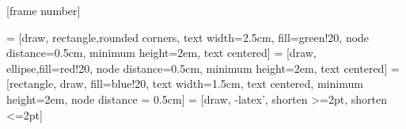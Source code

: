 \usepackage[french]{babel}
\usepackage{lmodern}
\usepackage{graphicx}
\usepackage{xcolor}
\usepackage{textcomp} 
\usepackage{amsmath, amsfonts, amssymb, amsthm}
\usepackage{booktabs,multirow}
\usepackage{setspace}
\usepackage{float}
\usepackage{pgfpages}
\usepackage{colortbl}
\usepackage{epstopdf}
\usepackage{framed}
\usepackage{etoolbox}
\usepackage{tikz}



[frame number]

\usetikzlibrary{shapes,arrows,calc, positioning}
 = [draw, rectangle,rounded corners, text width=2.5cm, fill=green!20, node distance=0.5cm, minimum height=2em, text centered]
 = [draw, ellipse,fill=red!20, node distance=0.5cm, minimum height=2em, text centered]
 = [rectangle, draw, fill=blue!20, 
    text width=1.5cm, text centered, minimum height=2em, node distance = 0.5cm]
 = [draw, -latex', shorten >=2pt, shorten <=2pt]

\AtBeginSection[]
{\ifnum \thesection>0
  \begin{frame}
  \vfill
  \begin{center}
  \LARGE
  \textcolor{grayInsee}{\insertsectionhead}
  \end{center}
  \vfill
  \end{frame}
\else
\fi
}
\AtBeginSubsection[]{}


